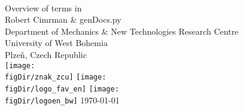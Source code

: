 \begin{titlepage}
  \begin{center}
    \ \\
    [40mm]
    \Huge Overview of terms in \sfe{} \\
    [10mm]
    \huge Robert Cimrman \& genDocs.py \\
    [20mm]
    \Large
    Department of Mechanics \& New Technologies Research Centre \\
    University of West Bohemia \\
    Plze\v{n}, Czech Republic\\
    [10mm]
    \texttt{[image: \\figDir/znak\_zcu]}
    \hspace{5mm}
    \texttt{[image: \\figDir/logo\_fav\_en]}
    \hspace{5mm}
    \texttt{[image: \\figDir/logoen\_bw]}
    \vfill
    \today
  \end{center}
\end{titlepage}
